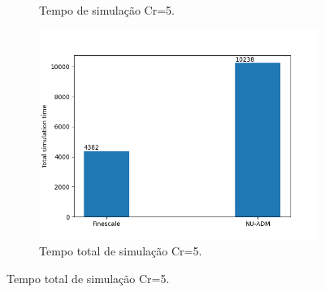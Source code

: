 \documentclass[professionalfont]{beamer}
\begin{document}
\begin{frame}{\FrameProblemName}
\begin{figure}[!htbp]
\begin{subfigure}{.48\textwidth}
            \caption{Tempo de simulação Cr=5.}
        \end{subfigure}
        \hfill
        \begin{subfigure}{.48\textwidth}
            \centering
            \includegraphics[scale=0.4]{./imgs/pr4/total_time_cr5.png}
            \caption{Tempo total de simulação Cr=5.}
        \end{subfigure}
        \label{fig:fig4.2_pr4}
    \end{figure}
\end{frame}
\end{document}
